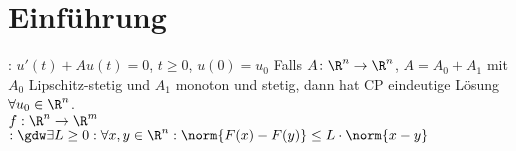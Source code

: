 
\newcommand{\directoryPrefix}{../latex/} %



\setcounter{section}{-1}
	\section{Einführung}
	: $u'(t)+Au(t)=0$, $t\geq0$, $u(0)=u_0$
	 Falls $A\colon\R^n\to\R^n$, $A=A_0+A_1$ mit $A_0$ Lipschitz-stetig und $A_1$ monoton und stetig, dann hat CP eindeutige Lösung $\forall u_0\in\R^n$.\\
	$f:\R^n\to\R^m$  $:\gdw\exists L\geq0:\forall x,y\in\R^n:\norm{F(x)-F(y)}\leq L\cdot\norm{x-y}$
	
